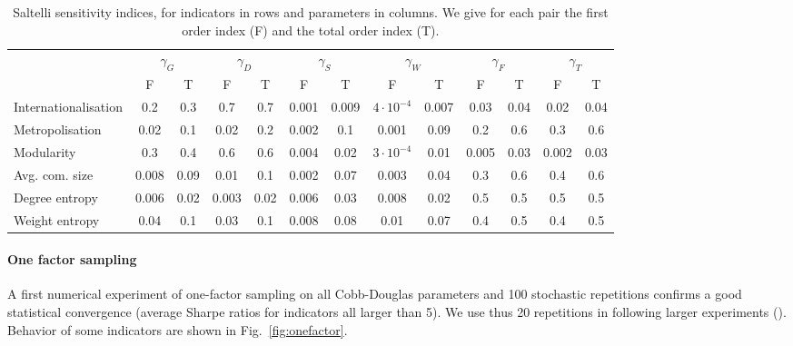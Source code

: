 \documentclass[11pt]{article}
\begin{document}
\begin{table}
\caption{Saltelli sensitivity indices, for indicators in rows and parameters in columns. We give for each pair the first order index (F) and the total order index (T).\label{tab:saltelli}}
\hspace{-1cm}\begin{tabular}{|l|c|c|c|c|c|c|c|c|c|c|c|c|}
\hline
 & \multicolumn{2}{|c|}{$\gamma_G$} & \multicolumn{2}{|c|}{$\gamma_D$} & \multicolumn{2}{|c|}{$\gamma_S$} & \multicolumn{2}{|c|}{$\gamma_W$} & \multicolumn{2}{|c|}{$\gamma_F$} & \multicolumn{2}{|c|}{$\gamma_T$} \\
 & F & T & F & T & F & T & F & T & F & T & F & T \\
 \hline
Internationalisation & 0.2 & 0.3 & 0.7 & 0.7 & 0.001 & 0.009 & $4\cdot 10^{-4}$ & 0.007 & 0.03 & 0.04 & 0.02 & 0.04 \\
Metropolisation & 0.02 & 0.1 & 0.02 & 0.2 & 0.002 & 0.1 & 0.001 & 0.09 & 0.2 & 0.6 & 0.3 & 0.6 \\
Modularity & 0.3 & 0.4 & 0.6 & 0.6 & 0.004 & 0.02 & $3\cdot 10^{-4}$ & 0.01 & 0.005 & 0.03 & 0.002 & 0.03 \\
Avg. com. size & 0.008 & 0.09 & 0.01 & 0.1 & 0.002 & 0.07 & 0.003 & 0.04 & 0.3 & 0.6 & 0.4 & 0.6 \\
Degree entropy & 0.006 & 0.02 & 0.003 & 0.02 & 0.006 & 0.03 & 0.008 & 0.02 & 0.5 & 0.5 & 0.5 & 0.5 \\
Weight entropy & 0.04 & 0.1 & 0.03 & 0.1 & 0.008 & 0.08 & 0.01 & 0.07 & 0.4 & 0.5 & 0.4 & 0.5 \\\hline
\end{tabular}
\end{table}



\paragraph{One factor sampling}

A first numerical experiment of one-factor sampling on all Cobb-Douglas parameters and 100 stochastic repetitions confirms a good statistical convergence (average Sharpe ratios for indicators all larger than 5). We use thus 20 repetitions in following larger experiments (). Behavior of some indicators are shown in Fig.~\ref{fig:onefactor}.
\end{document}
